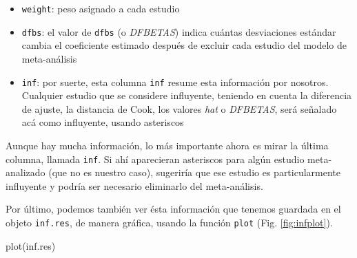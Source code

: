 \documentclass[
  bookmarksnumbered]{article}
\newenvironment{Shaded}{\begin{snugshade}}{\end{snugshade}}
\newcommand{\FunctionTok}[1]{\textcolor[rgb]{0.39,0.29,0.61}{#1}}
\newcommand{\NormalTok}[1]{\textcolor[rgb]{0.12,0.11,0.11}{#1}}
\begin{document}
\begin{itemize}
\item
  \texttt{weight}: peso asignado a cada estudio
\item
  \texttt{dfbs}: el valor de \texttt{dfbs} (o \emph{DFBETAS}) indica cuántas desviaciones estándar cambia el coeficiente estimado después de excluir cada estudio del modelo de meta-análisis
\item
  \texttt{inf}: por suerte, esta columna \texttt{inf} resume esta información por nosotros. Cualquier estudio que se considere influyente, teniendo en cuenta la diferencia de ajuste, la distancia de Cook, los valores \emph{hat} o \emph{DFBETAS}, será señalado acá como influyente, usando asteriscos
\end{itemize}

Aunque hay mucha información, lo más importante ahora es mirar la última columna, llamada \texttt{inf}. Si ahí aparecieran asteriscos para algún estudio meta-analizado (que no es nuestro caso), sugeriría que ese estudio es particularmente influyente y podría ser necesario eliminarlo del meta-análisis.

Por último, podemos también ver ésta información que tenemos guardada en el objeto \texttt{inf.res}, de manera gráfica, usando la función \texttt{plot} (Fig. \ref{fig:infplot}).

\begin{Shaded}
\begin{Highlighting}[]
\FunctionTok{plot}\NormalTok{(inf.res)}
\end{Highlighting}
\end{Shaded}
\end{document}
